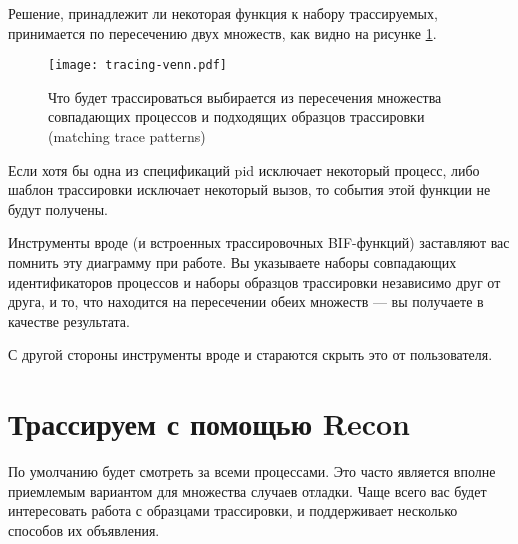 Решение, принадлежит ли некоторая функция к набору трассируемых, принимается по пересечению двух множеств, как видно на рисунке \ref{fig:tracing-venn}.

\begin{figure}
  \texttt{[image: tracing-venn.pdf]}%
  \centering%
	\caption{Что будет трассироваться выбирается из пересечения множества совпадающих процессов и подходящих образцов трассировки (matching trace patterns)}
   \label{fig:tracing-venn}
\end{figure}

Если хотя бы одна из спецификаций pid исключает некоторый процесс, либо шаблон трассировки исключает некоторый вызов, то события этой функции не будут получены.

Инструменты вроде  (и встроенных трассировочных BIF-функций) заставляют вас помнить эту диаграмму при работе. Вы указываете наборы совпадающих идентификаторов процессов и наборы образцов трассировки независимо друг от друга, и то, что находится на пересечении обеих множеств --- вы получаете в качестве результата.

С другой стороны инструменты вроде  и  стараются скрыть это от пользователя.
\FloatBarrier


\section{Трассируем с помощью Recon}

По умолчанию  будет смотреть за всеми процессами. Это часто является вполне приемлемым вариантом для множества случаев отладки. Чаще всего вас будет интересовать работа с образцами трассировки, и  поддерживает несколько способов их объявления.


